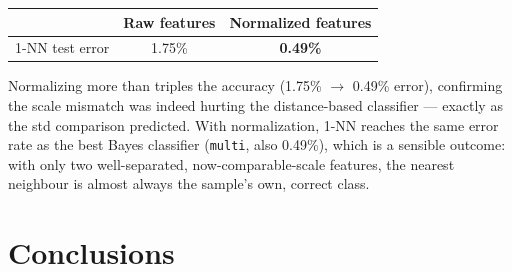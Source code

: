 \documentclass[11pt,a4paper]{article}
\begin{document}
\begin{table}[h!]
\centering
\begin{tabular}{@{}lcc@{}}
\toprule
 & Raw features & Normalized features \\
\midrule
1-NN test error & 1.75\% & \textbf{0.49\%} \\
\bottomrule
\end{tabular}
\end{table}

Normalizing more than triples the accuracy (1.75\% $\to$ 0.49\% error),
confirming the scale mismatch was indeed hurting the distance-based
classifier --- exactly as the std comparison predicted. With
normalization, 1-NN reaches the same error rate as the best Bayes
classifier (\texttt{multi}, also 0.49\%), which is a sensible outcome: with
only two well-separated, now-comparable-scale features, the nearest
neighbour is almost always the sample's own, correct class.

\section{Conclusions}
\end{document}
